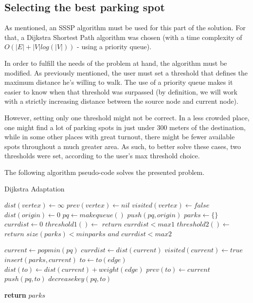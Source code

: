 \documentclass[a4paper, 12pt]{report}
\begin{document}
    \subsection{Selecting the best parking spot}  \label{selectpark}
    
    As mentioned, an SSSP algorithm must be used for this part of the solution. For that, a Dijkstra Shortest Path algorithm was chosen (with a time complexity of $O(|E| + |V|log(|V|))$ - using a priority queue).
    
    In order to fulfill the needs of the problem at hand, the algorithm must be modified. As previously mentioned, the user must set a threshold that defines the maximum distance he's willing to walk. The use of a priority queue makes it easier to know when that threshold was surpassed (by definition, we will work with a strictly increasing distance between the source node and current node). 
    
    However, setting only one threshold might not be correct. In a less crowded place, one might find a lot of parking spots in just under 300 meters of the destination, while in some other places with great turnout, there might be fewer available spots throughout a much greater area. As such, to better solve these cases, two thresholds were set, according to the user's max threshold choice.
    
    The following algorithm pseudo-code solves the presented problem.
    
    \begin{algorithm}[H]
        \label{alg:dijkstra}
    	\caption{Dijkstra Adaptation} 
	    \begin{algorithmic}[1]
		    \State $dist(vertex) \leftarrow \infty$
		    \State $prev(vertex) \leftarrow nil$
		    \State $visited(vertex) \leftarrow false$
		\EndFor
		\State $dist(origin) \leftarrow 0$
		\State $pq \leftarrow makequeue()$
		\State $push(pq, origin)$
		\State
		\State $parks \leftarrow \{\}$
		\State $currdist \leftarrow 0$
		\State $threshold1() \leftarrow $ $return$ $currdist < max1$
		\State $threshold2() \leftarrow $ $return$ $size(parks) < minparks$ $and$ $currdist < max2$
		\State
		
		    \State $current \leftarrow popmin(pq)$
		    \State $currdist \leftarrow dist(current)$
		    \State $visited(current) \leftarrow true$
		        \State $insert(parks, current)$
		    \EndIf
		        \State $to \leftarrow to(edge)$
		            \State $dist(to) \leftarrow dist(current) + weight(edge)$
		            \State $prev(to) \leftarrow current$
		                \State $push(pq, to)$
		            \Else
		                \State $decreasekey(pq, to)$
		            \EndIf
		        \EndIf
		    \EndFor
		\EndWhile
		
		\State \textbf{return} $parks$
	    \end{algorithmic} 
    \end{algorithm}
    
\end{document}
